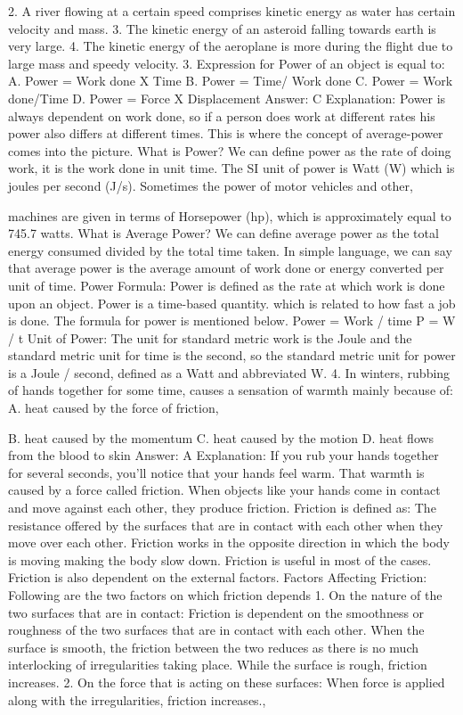 2. A river flowing at a certain speed comprises kinetic energy as
water has certain velocity and mass.
3. The kinetic energy of an asteroid falling towards earth is very
large.
4. The kinetic energy of the aeroplane is more during the flight due
to large mass and speedy velocity.
3. Expression for Power of an object is equal to:
A. Power = Work done X Time
B. Power = Time/ Work done
C. Power = Work done/Time
D. Power = Force X Displacement
Answer: C
Explanation: Power is always dependent on work done, so if a person
does work at different rates his power also differs at different
times. This is where the concept of average-power comes into the
picture.
What is Power?
We can define power as the rate of doing work, it is the work done
in unit time. The SI unit of power is Watt (W) which is joules per
second (J/s). Sometimes the power of motor vehicles and other, 


machines are given in terms of Horsepower (hp), which is
approximately equal to 745.7 watts.
What is Average Power?
We can define average power as the total energy consumed divided
by the total time taken. In simple language, we can say that average
power is the average amount of work done or energy converted per
unit of time.
Power Formula:
Power is defined as the rate at which work is done upon an object.
Power is a time-based quantity. which is related to how fast a job is
done. The formula for power is mentioned below.
Power = Work / time
P = W / t
Unit of Power:
The unit for standard metric work is the Joule and the standard
metric unit for time is the second, so the standard metric unit for
power is a Joule / second, defined as a Watt and abbreviated W.
4. In winters, rubbing of hands together for some time, causes
a sensation of warmth mainly because of:
A. heat caused by the force of friction, 


B. heat caused by the momentum
C. heat caused by the motion
D. heat flows from the blood to skin
Answer: A
Explanation: If you rub your hands together for several seconds,
you'll notice that your hands feel warm. That warmth is caused by a
force called friction. When objects like your hands come in contact
and move against each other, they produce friction.
Friction is defined as: The resistance offered by the surfaces that
are in contact with each other when they move over each other.
Friction works in the opposite direction in which the body is moving
making the body slow down. Friction is useful in most of the cases.
Friction is also dependent on the external factors.
Factors Affecting Friction: Following are the two factors on which
friction depends
1. On the nature of the two surfaces that are in contact: Friction is
dependent on the smoothness or roughness of the two surfaces that
are in contact with each other. When the surface is smooth, the
friction between the two reduces as there is no much interlocking of
irregularities taking place. While the surface is rough, friction
increases.
2. On the force that is acting on these surfaces: When force is
applied along with the irregularities, friction increases., 


